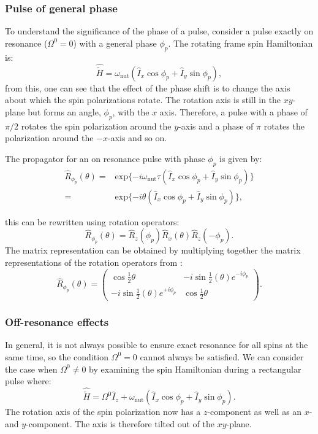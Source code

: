 \subsubsection{Pulse of general phase}

To understand the significance of the phase of a pulse, consider a pulse exactly on resonance
($\Omega^0 = 0$) with a general phase $\phi_p$. The rotating frame spin Hamiltonian is:
\begin{equation}
  \hat{\tilde{H}} = \omega_{\text{nut}}(\hat{I}_x\cos\phi_p + \hat{I}_y\sin\phi_p),
\end{equation}
from this, one can see that the effect of the phase shift is to change the axis about
which the spin polarizations rotate. The rotation axis is still in the $xy$-plane but forms
an angle, $\phi_p$, with the $x$ axis. Therefore, a pulse with a phase of $\pi/2$ rotates the spin
polarization around the $y$-axis and a phase of $\pi$ rotates the polarization around the $-x$-axis and
so on.

The propagator for an on resonance pulse with phase $\phi_p$ is given by:
\begin{align}
  \hat{R}_{\phi_p}(\theta) =& \text{exp}\{-i\omega_{\text{nut}}\tau(\hat{I}_x\cos\phi_p + \hat{I}_y\sin\phi_p)\}\\
  =& \text{exp}\{-i\theta(\hat{I}_x\cos\phi_p + \hat{I}_y\sin\phi_p)\},
\end{align}

this can be rewritten using rotation operators:
\begin{equation}
  \hat{R}_{\phi_p}(\theta) = \hat{R}_z(\phi_p)\hat{R}_x(\theta)\hat{R}_z(-\phi_p).
\end{equation}
The matrix representation can be obtained by multiplying together the matrix
representations of the rotation operators from :
\begin{equation}
  \hat{R}_{\phi_p}(\theta) = \begin{pmatrix}
    \cos\frac{1}{2}\theta & -i\sin\frac{1}{2}(\theta)e^{-i\phi_p}\\
    -i\sin\frac{1}{2}(\theta)e^{+i\phi_p} & \cos\frac{1}{2}\theta
\end{pmatrix}.
\end{equation}

\subsubsection{Off-resonance effects}

In general, it is not always possible to ensure exact resonance for all spins at the same
time, so the condition $\Omega^0 = 0$ cannot always be satisfied. We can consider the
case when $\Omega^0 \neq 0$ by examining the spin Hamiltonian during a rectangular
pulse where:
\begin{equation}
  \hat{\tilde{H}} = \Omega^0\hat{I}_z + \omega_{\text{nut}}(\hat{I}_x\cos\phi_p + \hat{I}_y\sin\phi_p).
\end{equation}
The rotation axis of the spin polarization now has a $z$-component as well as an $x$- and $y$-component. The
axis is therefore tilted out of the $xy$-plane.

